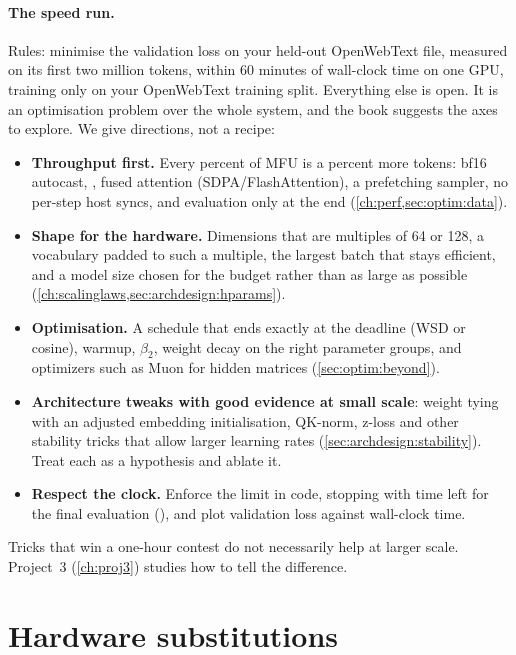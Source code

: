 \paragraph{The speed run.}\label{sec:proj1:speedrun} Rules: minimise the validation loss on your
held-out OpenWebText file, measured on its first two million tokens, within 60 minutes of
wall-clock time on one GPU, training only on your OpenWebText training split. Everything else is
open. It is an optimisation problem over the whole system, and the book suggests the axes to
explore. We give directions, not a recipe:
\begin{itemize}
  \item \textbf{Throughput first.} Every percent of MFU is a percent more tokens: bf16 autocast,
        , fused attention (SDPA/FlashAttention), a prefetching sampler, no
        per-step host syncs, and evaluation only at the end (\cref{ch:perf,sec:optim:data}).
  \item \textbf{Shape for the hardware.} Dimensions that are multiples of 64 or 128, a vocabulary
        padded to such a multiple, the largest batch that stays efficient, and a model size chosen for
        the budget rather than as large as possible (\cref{ch:scalinglaws,sec:archdesign:hparams}).
  \item \textbf{Optimisation.} A schedule that ends exactly at the deadline (WSD or cosine),
        warmup, $\beta_2$, weight decay on the right parameter groups, and optimizers such as Muon
        for hidden matrices (\cref{sec:optim:beyond}).
  \item \textbf{Architecture tweaks with good evidence at small scale}: weight tying with an
        adjusted embedding initialisation, QK-norm, z-loss and other stability tricks that allow
        larger learning rates (\cref{sec:archdesign:stability}). Treat each as a hypothesis and
        ablate it.
  \item \textbf{Respect the clock.} Enforce the limit in code, stopping with time left for the
        final evaluation (), and plot validation loss
        against wall-clock time.
\end{itemize}
Tricks that win a one-hour contest do not necessarily help at larger scale. Project~3
(\cref{ch:proj3}) studies how to tell the difference.

\section{Hardware substitutions}\label{sec:proj1:outside}

